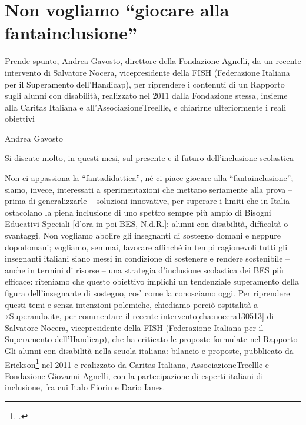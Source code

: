 \chapter{Non vogliamo “giocare alla fantainclusione”}
\label{cha:gavosto270513}
\epigraph{Prende spunto, Andrea Gavosto, direttore della Fondazione Agnelli, da un recente intervento di Salvatore Nocera, vicepresidente della FISH (Federazione Italiana per il Superamento dell’Handicap), per riprendere i contenuti di un Rapporto sugli alunni con disabilità, realizzato nel 2011 dalla Fondazione stessa, insieme alla Caritas Italiana e all’AssociazioneTreellle, e chiarirne ulteriormente i reali obiettivi}{Andrea Gavosto}

Si discute molto, in questi mesi, sul presente e il futuro dell'inclusione scolastica

Non ci appassiona la “fantadidattica”, né ci piace giocare alla “fantainclusione”; siamo, invece, interessati a sperimentazioni che mettano seriamente alla prova – prima di generalizzarle – soluzioni innovative, per superare i limiti che in Italia ostacolano la piena inclusione di uno spettro sempre più ampio di Bisogni Educativi Speciali [d'ora in poi BES, N.d.R.]: alunni con disabilità, difficoltà o svantaggi.
Non vogliamo abolire gli insegnanti di sostegno domani e neppure dopodomani; vogliamo, semmai, lavorare affinché in tempi ragionevoli tutti gli insegnanti italiani siano messi in condizione di sostenere e rendere sostenibile – anche in termini di risorse – una strategia d'inclusione scolastica dei BES più efficace: riteniamo che questo obiettivo implichi un tendenziale superamento della figura dell'insegnante di sostegno, così come la conosciamo oggi.
Per riprendere questi temi e senza intenzioni polemiche, chiediamo perciò ospitalità a «Superando.it», per commentare il recente intervento\vref*{cha:nocera130513} di Salvatore Nocera, vicepresidente della FISH (Federazione Italiana per il Superamento dell'Handicap), che ha criticato le proposte formulate nel Rapporto Gli alunni con disabilità nella scuola italiana: bilancio e proposte, pubblicato da Erickson\footcite{treellle2011alunni} nel 2011 e realizzato da Caritas Italiana, AssociazioneTreellle e Fondazione Giovanni Agnelli, con la partecipazione di esperti italiani di inclusione, fra cui Italo Fiorin e Dario Ianes.

